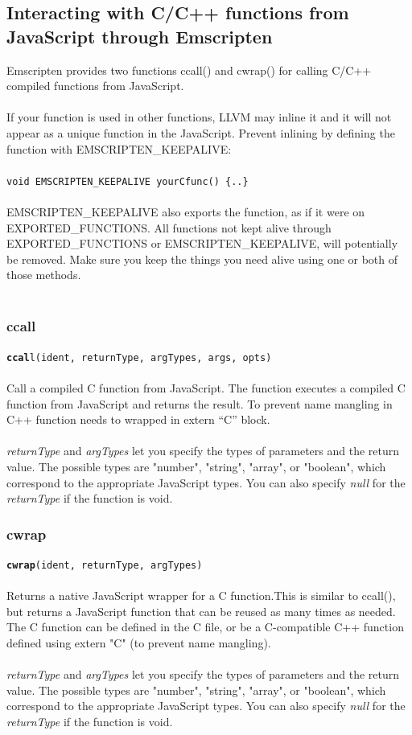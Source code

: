 \documentclass[12pt]{article}
\begin{document}
\subsection{Interacting with C/C++ functions from JavaScript through Emscripten}
Emscripten provides two functions ccall() and cwrap() for calling C/C++ compiled functions from JavaScript. \\ \\
If your function is used in other functions, LLVM may inline it and it will not appear as a unique function in the JavaScript. Prevent inlining by defining the function with EMSCRIPTEN\_KEEPALIVE:\\ \\
\texttt{void EMSCRIPTEN\_KEEPALIVE yourCfunc() \{..\}}\\ \\
EMSCRIPTEN\_KEEPALIVE also exports the function, as if it were on EXPORTED\_FUNCTIONS. All functions not kept alive through EXPORTED\_FUNCTIONS or EMSCRIPTEN\_KEEPALIVE, will potentially be removed. Make sure you keep the things you need alive using one or both of those methods. \\ \\

\subsubsection{ccall}
\texttt{\textbf{ccal}l(ident, returnType, argTypes, args, opts)}\\ \\
Call a compiled C function from JavaScript. The function executes a compiled C function from JavaScript and returns the result. To prevent name mangling in C++ function needs to wrapped in extern “C” block.\\ \\
\emph{returnType} and \emph{argTypes} let you specify the types of parameters and the return value. The possible types are "number", "string", "array", or "boolean", which correspond to the appropriate JavaScript types. You can also specify \emph{null} for the \emph{returnType} if the function is void.

\pagebreak

\subsubsection{cwrap}
\texttt{\textbf{cwrap}(ident, returnType, argTypes)}\\ \\
Returns a native JavaScript wrapper for a C function.This is similar to ccall(), but returns a JavaScript function that can be reused as many times as needed. The C function can be defined in the C file, or be a C-compatible C++ function defined using extern "C" (to prevent name mangling).\\ \\
\emph{returnType} and \emph{argTypes} let you specify the types of parameters and the return value. The possible types are "number", "string", "array", or "boolean", which correspond to the appropriate JavaScript types. You can also specify \emph{null} for the \emph{returnType} if the function is void.
\end{document}

